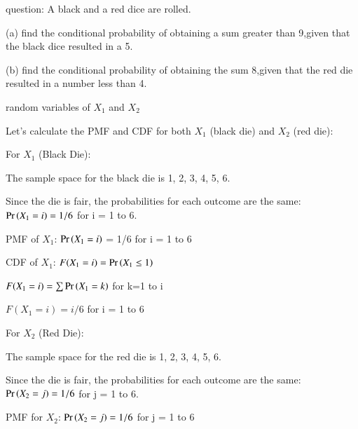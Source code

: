 \documentclass[journal,12pt,twocolumn]{IEEEtran}
\renewcommand\thetable{\arabic{table}}
\begin{document}



\maketitle

\newpage


\bigskip

\renewcommand{\thefigure}{\theenumi}
\renewcommand{\thetable}{\theenumi}
question: A black and a red dice are rolled.

(a) find the conditional probability of obtaining a sum greater than 9,given that the black dice resulted in a 5.

(b) find the conditional probability of obtaining the sum 8,given that the red die resulted in a number less than 4.

\solution
\begin{table}[!ht]

\caption{random variables of $X_1$ and $X_2$}
\label{tab:random variables}
\end{table}

Let's calculate the PMF and CDF for both $X_1$ (black die) and $X_2$ (red die):

For $X_1$ (Black Die):

The sample space for the black die is {1, 2, 3, 4, 5, 6}.

Since the die is fair, the probabilities for each outcome are the same: $\Pr\left(X_1 = i\right) = 1/6$ for i = 1 to 6.

PMF of $X_1$:
$\Pr\left(X_1 = i\right)$ = 1/6 for i = 1 to 6

CDF of $X_1$:
$F(X_1=i)=\Pr\left(X_1\le1\right)$

$F(X_1=i)=\sum{\ensuremath{\Pr\left(X_1=k\right)}}$ for k=1 to i

$F(X_1=i) = i/6$ for i = 1 to 6

For $X_2$ (Red Die):

The sample space for the red die is {1, 2, 3, 4, 5, 6}.

Since the die is fair, the probabilities for each outcome are the same: $\Pr\left(X_2 = j\right) = 1/6$ for j = 1 to 6.

PMF for $X_2$:
$\Pr\left(X_2 = j\right) = 1/6$ for j = 1 to 6
\end{document}
